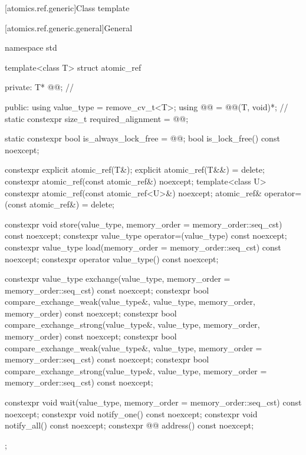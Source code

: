 [atomics.ref.generic]{Class template }

[atomics.ref.generic.general]{General}

%
%
\begin{codeblock}
namespace std {
  template<class T> struct atomic_ref {
  private:
    T* @@;             // \expos

  public:
    using value_type = remove_cv_t<T>;
    using @@ = @@(T, void)*;       // \expos
    static constexpr size_t required_alignment = @@;

    static constexpr bool is_always_lock_free = @@;
    bool is_lock_free() const noexcept;

    constexpr explicit atomic_ref(T&);
    explicit atomic_ref(T&&) = delete;
    constexpr atomic_ref(const atomic_ref&) noexcept;
    template<class U>
      constexpr atomic_ref(const atomic_ref<U>&) noexcept;
    atomic_ref& operator=(const atomic_ref&) = delete;

    constexpr void store(value_type, memory_order = memory_order::seq_cst) const noexcept;
    constexpr value_type operator=(value_type) const noexcept;
    constexpr value_type load(memory_order = memory_order::seq_cst) const noexcept;
    constexpr operator value_type() const noexcept;

    constexpr value_type exchange(value_type,
                                  memory_order = memory_order::seq_cst) const noexcept;
    constexpr bool compare_exchange_weak(value_type&, value_type,
                                         memory_order, memory_order) const noexcept;
    constexpr bool compare_exchange_strong(value_type&, value_type,
                                           memory_order, memory_order) const noexcept;
    constexpr bool compare_exchange_weak(value_type&, value_type,
                                         memory_order = memory_order::seq_cst) const noexcept;
    constexpr bool compare_exchange_strong(value_type&, value_type,
                                           memory_order = memory_order::seq_cst) const noexcept;

    constexpr void wait(value_type, memory_order = memory_order::seq_cst) const noexcept;
    constexpr void notify_one() const noexcept;
    constexpr void notify_all() const noexcept;
    constexpr @@ address() const noexcept;
  };
}
\end{codeblock}


